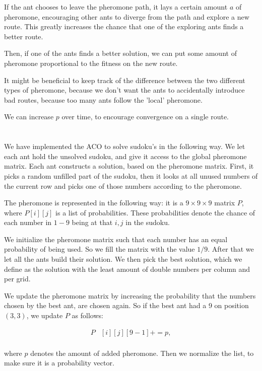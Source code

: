 \documentclass[11pt]{article}
\begin{document}
If the ant chooses to leave the pheromone path, it lays a certain amount $a$ of pheromone, encouraging other ants to diverge from the path and explore a new route. This greatly increases the chance that one of the exploring ants finds a better route.

Then, if one of the ants finds a better solution, we can put some amount of pheromone proportional to the fitness on the new route.

It might be beneficial to keep track of the difference between the two different types of pheromone, because we don't want the ants to accidentally introduce bad routes, because too many ants follow the 'local' pheromone.

We can increase $p$ over time, to encourage convergence on a single route. 


\section{}


We have implemented the ACO to solve sudoku's in the following way. We let each ant hold the unsolved sudoku, and give it access to the global pheromone matrix. Each ant constructs a solution, based on the pheromone matrix. First, it picks a random unfilled part of the sudoku, then it looks at all unused numbers of the current row and picks one of those numbers according to the pheromone.

The pheromone is represented in the following way: it is a $9\times9\times9$ matrix $P$, where $P[i][j]$ is a list of probabilities. These probabilities denote the chance of each number in $1-9$ being at that $i,j$ in the sudoku.

We initialize the pheromone matrix such that each number has an equal probability of being used. So we fill the matrix with the value $1/9$. After that we let all the ants build their solution. We then pick the best solution, which we define as the solution with the least amount of double numbers per column and per grid. 

We update the pheromone matrix by increasing the probability that the numbers chosen by the best ant, are chosen again. So if the best ant had a 9 on position $(3,3)$, we update $P$ as follows:

\begin{align*}
	P&[i][j][9-1] += p, \\
\end{align*}

where $p$ denotes the amount of added pheromone. Then we normalize the list, to make sure it is a probability vector.
\end{document}
